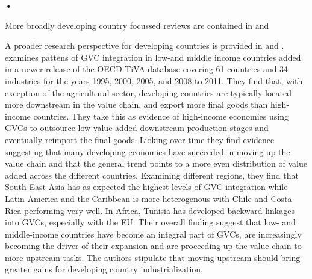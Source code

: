 \textbf{\textbf{•}}\documentclass[a4paper]{article}
\begin{document}
More broadly developing country focussed reviews are contained in \citet{foster2015global} and \citet{kowalski2015participation}

A proader research perspective for developing countries is provided in \citet{Kummritz20162} and \citet{Kummritz20161}. \citet{Kummritz20162} examines pattens of GVC integration in low-and middle income countries added in a newer release of the OECD TiVA database covering 61 countries and 34 industries for the years 1995, 2000, 2005, and 2008 to 2011. They find that, with exception of the agricultural sector, developing countries are typically located more downstream in the value chain, and export more final goods than high-income countries. They take this as evidence of high-income economies using GVCs to outsource low value added downstream production stages and eventually reimport the final goods. Lioking over time they find evidence suggesting that many developing economies have succeeded in moving up the value chain and that the general trend points to a more even distribution of value added across the different countries. Examining different regions, they find that South-East Asia has as expected the highest levels of GVC integration while Latin America and the Caribbean is more heterogenous with Chile and Costa Rica performing very well. In Africa, Tunisia has developed backward linkages into GVCs, especially with the EU. Their overall finding suggest that low- and middle-income countries have become an integral part of GVCs, are increasingly becoming the driver of their expansion and are proceeding up the value chain to more upstream tasks. 
%
%
%
The authors stipulate that moving upstream should bring greater gains for developing country industrialization.
\newline 
\end{document}
